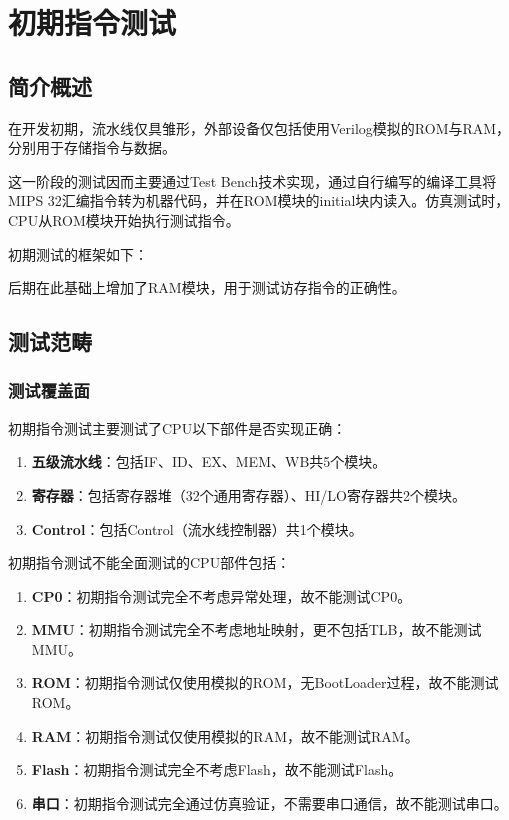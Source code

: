 \chapter{初期指令测试}

\section{简介概述}

在开发初期，流水线仅具雏形，外部设备仅包括使用Verilog模拟的ROM与RAM，分别用于存储指令与数据。

这一阶段的测试因而主要通过Test Bench技术实现，通过自行编写的编译工具将MIPS 32汇编指令转为机器代码，并在ROM模块的initial块内读入。仿真测试时，CPU从ROM模块开始执行测试指令。

初期测试的框架如下：


后期在此基础上增加了RAM模块，用于测试访存指令的正确性。


\section{测试范畴}

\subsection{测试覆盖面}


初期指令测试主要测试了CPU以下部件是否实现正确：

\begin{enumerate}
    \item {\bf 五级流水线}：包括IF、ID、EX、MEM、WB共5个模块。
    \item {\bf 寄存器}：包括寄存器堆（32个通用寄存器）、HI/LO寄存器共2个模块。
    \item {\bf Control}：包括Control（流水线控制器）共1个模块。
\end{enumerate}

初期指令测试不能全面测试的CPU部件包括：

\begin{enumerate}
    \item {\bf CP0}：初期指令测试完全不考虑异常处理，故不能测试CP0。
    \item {\bf MMU}：初期指令测试完全不考虑地址映射，更不包括TLB，故不能测试MMU。
    \item {\bf ROM}：初期指令测试仅使用模拟的ROM，无BootLoader过程，故不能测试ROM。
    \item {\bf RAM}：初期指令测试仅使用模拟的RAM，故不能测试RAM。
    \item {\bf Flash}：初期指令测试完全不考虑Flash，故不能测试Flash。
    \item {\bf 串口}：初期指令测试完全通过仿真验证，不需要串口通信，故不能测试串口。
\end{enumerate}

